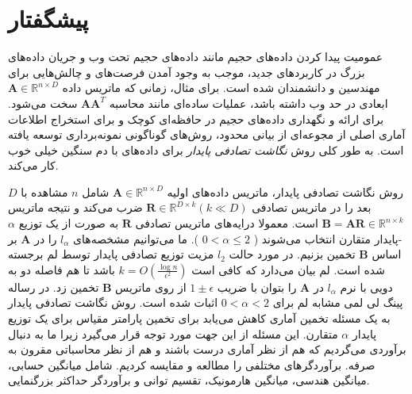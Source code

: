 \chapter{پیشگفتار}

عمومیت پیدا کردن داده‌های حجیم مانند داده‌های حجیم تحت وب و جریان‌ داده‌های بزرگ در کاربردهای جدید،
موجب به وجود آمدن فرصت‌های و چالش‌هایی برای مهندسین و دانشمندان شده است.%
\cite{li2007stable}
برای مثال، زمانی که ماتریس داده 
$\mathbf{A} \in \mathbb{R}^{n \times D}$
ابعادی در حد وب داشته باشد، عملیات ساده‌ای مانند محاسبه
$\mathbf{A} \mathbf{A}^T$
سخت می‌شود.
برای ارائه و نگهداری داده‌های حجیم در حافظه‌ای کوچک و برای استخراج اطلاعات آماری اصلی از مجوعه‌ای از بیانی محدود، روش‌های گوناگونی نمونه‌برداری توسعه‌ یافته است. به طور کلی روش 
\textit{نگاشت تصادفی پایدار}%
 برای داده‌های با دم سنگین خیلی خوب کار می‌کند.

روش نگاشت تصادفی پایدار، ماتریس داده‌های اولیه 
$\mathbf{A} \in \mathbb{R}^{n \times D}$
شامل 
$n$
مشاهده با
$D$
بعد را در ماتریس تصادفی 
$\mathbf{R} \in \mathbb{R}^{D \times k} (k \ll D)$
 ضرب می‌کند و نتیجه ماتریس
$\mathbf{B} = \mathbf{AR} \in \mathbb{R}^{n \times k}$
است. 
معمولا درایه‌های ماتریس تصادفی
$\mathbf{R}$
به صورت 
%
از یک توزیع 
$\alpha$
-پایدار متقارن انتخاب می‌شوند (
$ 0 < \alpha \leq 2$
).
ما می‌توانیم مشخصه‌های 
$l_\alpha$
را در 
$\mathbf{A}$
بر اساس 
$\mathbf{B}$
تخمین بزنیم. در مورد حالت 
$l_2$
مزیت توزیع تصادفی پایدار توسط لم 
%
\cite{litez103}
برجسته شده است. لم 
بیان می‌دارد که کافی است 
$k=O(\frac{ \log  n}{\epsilon^ 2})$
باشد تا هم فاصله دو به دویی با نرم 
$l_\alpha$
در 
$\mathbf{A}$
را بتوان با ضریب 
$1 \pm \epsilon$
از روی ماتریس 
$\mathbf{B}$
تخمین زد. در رساله پینگ لی%
\cite{li2007stable}
لمی مشابه لم 
برای 
$0 < \alpha < 2$
اثبات شده است. روش نگاشت تصادفی پایدار به یک مسئله تخمین آماری کاهش می‌یابد برای تخمین پارامتر مقیاس برای یک توزیع پایدار $\alpha$ متقارن. این مسئله از این جهت مورد توجه قرار می‌گیرد زیرا ما به دنبال برآوردی می‌گردیم که هم از نظر آماری درست باشند و هم از نظر محاسباتی مقرون به صرفه. برآوردگرهای مختلفی را مطالعه و مقایسه کردیم. شامل میانگین حسابی، میانگین هندسی، میانگین هارمونیک، تقسیم توانی%
و برآوردگر حداکثر بزرگنمایی.

